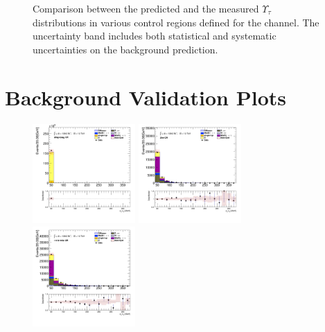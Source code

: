 \begin{figure}[!htp]
\begin{center}
			\end{center}
			\caption{
			Comparison between the predicted and the measured $\Upsilon_{\tau}$ distributions in various control regions defined for the \taujets channel. The uncertainty band includes both statistical and systematic uncertainties on the background prediction. 
			}
			\label{fig:bkg-met-phi-taujets}
		\end{figure}

		\clearpage
	\section{\taulep Background Validation Plots}\label{sec:taulep-valid-plots}
		\clearpage

		\begin{figure}[!htp]
			\begin{center}    
			\includegraphics[width=0.35\textwidth]{chapters/chapter6_HPlus/images/taulep/tau_0_pt_DILEP_BTAG.png}
			\includegraphics[width=0.35\textwidth]{chapters/chapter6_HPlus/images/taulep/tau_0_pt_ZEE.png} \\
			\includegraphics[width=0.35\textwidth]{chapters/chapter6_HPlus/images/taulep/tau_0_pt_TAUEL_BVETO.png} 

\end{center}
\end{figure}
